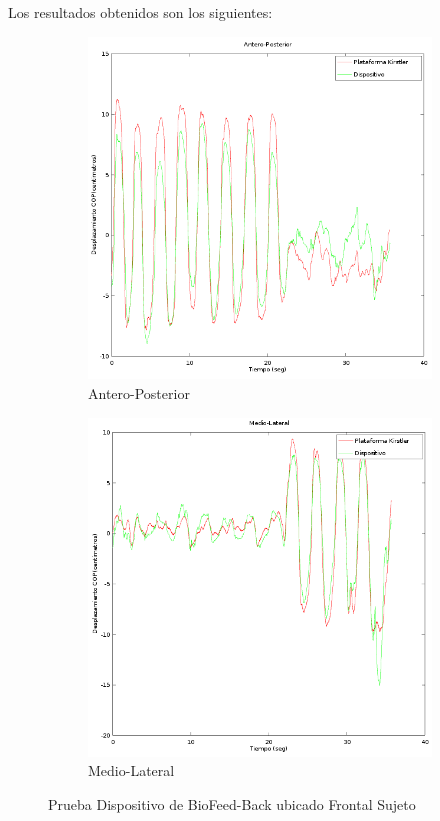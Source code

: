 \documentclass[12pt,a4paper]{article}
\newcommand{\nombreDispositivo}{Dispositivo de BioFeed-Back }
\begin{document}
Los resultados obtenidos son los siguientes:
	
	\begin{figure}[H]
		\centering
		\begin{subfigure}{.5\textwidth}
			\centering
			\includegraphics[width=1\linewidth]{images/pruebas/Frontal/Antero-Posterior}
			\caption{Antero-Posterior}
			\label{fig:anteroPosterioFrontal}
		\end{subfigure}%
		\begin{subfigure}{.5\textwidth}
			\centering
			\includegraphics[width=1\linewidth]{images/pruebas/Frontal/Medio-Lateral}
			\caption{Medio-Lateral}
			\label{fig:medioLateralFrontal}
		\end{subfigure}
		\caption{Prueba \nombreDispositivo ubicado Frontal Sujeto}
		\label{fig:pruebaLateralFrontal}
	\end{figure}
	
\end{document}
